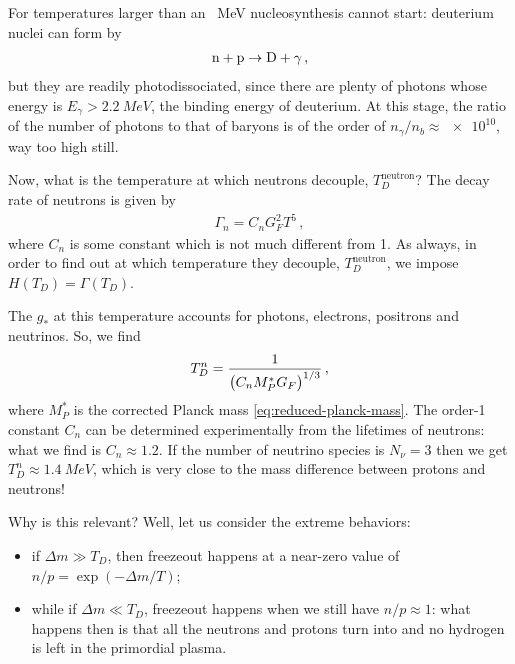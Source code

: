 \documentclass[main.tex]{subfiles}
\begin{document}
For temperatures larger than an \SI{}{MeV} nucleosynthesis cannot start: deuterium nuclei can form by
%
\begin{align}
\ce{n} + \ce{p} \to \ce{D} + \gamma 
\,,
\end{align}
%
but they are readily photodissociated, since there are plenty of photons whose energy is \(E_\gamma > \SI{2.2}{MeV}\), the binding energy of deuterium.
At this stage, the ratio of the number of photons to that of baryons is of the order of \(n_\gamma / n_b \approx \num{e10}\), way too high still. 

Now, what is the temperature at which neutrons decouple, \(T^{\text{neutron}}_{D}\)? The decay rate of neutrons is given by 
%
\begin{align}
\Gamma_{n} = C_n G_F^2 T^{5}
\,,
\end{align}
%
where \(C_n\) is some constant which is not much different from 1. 
As always, in order to find out at which temperature they decouple, \(T^{\text{neutron}}_{D}\), we impose \(H (T_D) = \Gamma (T_D)\). 

The \(g_*\) at this temperature accounts for photons, electrons, positrons and neutrinos. So, we find 
%
\begin{align}
T^{n}_{D} = \frac{1}{\qty(C_n M_P^{*} G_F)^{1/3}}
\,,
\end{align}
%
where \(M_P^{*}\) is the corrected Planck mass \eqref{eq:reduced-planck-mass}. The order-1 constant \(C_n\) can be determined experimentally from the lifetimes of neutrons: what we find is \(C_n \approx \num{1.2}\).
If the number of neutrino species is \(N_\nu = 3\) then we get \(T^{n}_{D } \approx \SI{1.4}{MeV}\), which is very close to the mass difference between protons and neutrons! 

Why is this relevant? Well, let us consider the extreme behaviors: 
\begin{itemize}
    \item if \(\Delta m \gg T_D\), then freezeout happens at a near-zero value of \(n/p = \exp( - \Delta m / T)\);
    \item while if \(\Delta m \ll T_D\), freezeout happens when we still have \(n / p \approx 1\): what happens then is that all the neutrons and protons turn into  and no hydrogen is left in the primordial plasma. 
\end{itemize}


\end{document}
